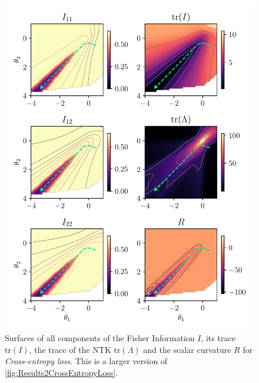 \begin{figure}
	\centering
	\includegraphics{Experiment2/plots/CrossEntropyLoss_tracecomparison_Big.pdf}
	\caption{Surfaces of all components of the Fisher Information $I$, its trace $\mathrm{tr}(I)$, the trace of the NTK $\mathrm{tr}(\Lambda)$ and the scalar curvature $R$ for \emph{Cross-entropy loss}. This is a larger version of \cref{fig:Results2CrossEntropyLoss}.}
	\label{fig:Results2CrossEntropyLossBig}
\end{figure}